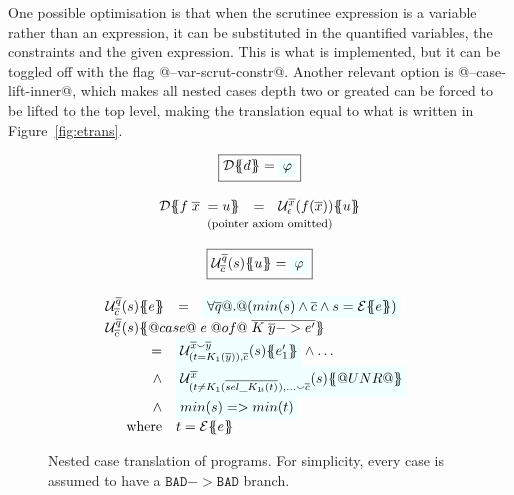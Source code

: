 One possible optimisation is that when the scrutinee
expression is a variable rather than an expression, it can be
substituted in the quantified variables, the constraints and the given
expression. This is what is implemented, but it can be toggled off
with the flag @--var-scrut-constr@. Another relevant option is
@--case-lift-inner@, which makes all nested cases
depth two or greated can be forced to be lifted to the top level,
making the translation equal to what is written in
Figure~\ref{fig:etrans}.

\newcommand{\ut}[4]{{\cal U}^{#1}_{#2}(#3)\{\!\!\{#4\}\!\!\}}

\begin{figure}\small
\setlength{\arraycolsep}{2pt}
\[\begin{array}{c}
\ruleform{\dtrans{\Sigma}{d} = \formula{\phi}} \\ \\
\begin{array}{rcl}
  \dtrans{\Sigma}{f \;\ol{x}\; = u}
    & = & \ut{\ol{x}}{\epsilon}{f(\ol{x})}{u} \\
\end{array} \\
\mbox{{\footnotesize (pointer axiom omitted)}}
\\ \\
\ruleform{\ut{\ol{q}}{\ol{c}}{s}{u} = \formula{\phi}} \\ \\
\begin{array}{rcl}
\ut{\ol{q}}{\ol{c}}{s}{e}
  & = & \formula{\forall \ol{q} @.@
    (min(s) \land \ol{c} \land s = \etrans{\Sigma}{\Gamma}{e})} \\
\multicolumn{3}{l}{\ut{\ol{q}}{\ol{c}}{s}
    {@case@\;e\;@of@\;\ol{K\;\ol{y} -> e'}}} \\
\multicolumn{3}{l}{
\quad
  \begin{array}[t]{rl}
    = & \formula{\ut{\ol{x} \smallsmile \ol{y}}{(t = K_1(\ol{y})) , \ol{c}}{s}{e'_1}} \land \ldots  \\
    \land & \formula{ \ut{\ol{x}}{(t \neq K_1(\oln{{\sel{K_1}{i}}(t)}{}) , \ldots \smallsmile \ol{c}}{s}{@UNR@} } \\
    \land & \formula{min(s) => min(t)} \\
    \mbox{where} & t  =  \etrans{\Sigma}{\Gamma}{e}
 \end{array}
}
\end{array}
\end{array}\]
\caption{Nested case translation of programs.
For simplicity, every case is assumed to have a $\mathtt{BAD} -> \mathtt{BAD}$ branch.
\label{fig:nested-case-trans}
}
\end{figure}


